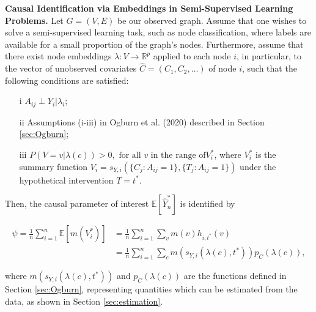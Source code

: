\documentclass{article}
\begin{document}
\begin{theorem} \textbf{Causal Identification via Embeddings in Semi-Supervised Learning Problems.}
\label{thm:identification}
Let $G = (V, E)$ be our observed graph. Assume that one wishes to solve a semi-supervised learning task, such as node classification, where labels are available for a small proportion of the graph's nodes. Furthermore, assume that there exist node embeddings $\lambda: V \to \mathbb{R}^p$ applied to each node $i$, in particular, to the vector of unobserved covariates $\hat{C} = (C_1, C_2, \hdots)$ of node $i$, such that the following conditions are satisfied:


\begin{itemize}
\item[i]  $A_{ij} \perp Y_i | \lambda_i$;
\item[ii]  Assumptions (i-iii) in Ogburn et al. (2020) \cite{Ogburn2020} described in Section \ref{sec:Ogburn};
\item[iii] $P(V = v| \lambda(c)) > 0, \mbox{ for all } v \mbox{ in the range of} V_i^*$, where $V_i^*$ is the summary function $V_i = s_{Y, i}(\{ C_j: A_{ij} =1\}, \{T_j: A_{ij} =1\})$ under the hypothetical intervention $ T = t^*$. 
\end{itemize}


Then, the causal parameter of interest  $\mathbb{E}[\hat{Y}_n^*]$ is identified by

\begin{align}
\label{eqn:identification}
\psi = \frac{1}{n} \sum_{i=1}^n \mathbb{E}[m(V_i^*)] &= \frac{1}{n} \sum_{i=1}^n \sum_v m(v) h_{i, t^*} (v) \\
&= \frac{1}{n} \sum_{i=1}^n \sum_{c} m(s_{Y, i} (\lambda(c), t^*)) p_C(\lambda(c)),
\end{align}


\noindent where $m(s_{Y, i} (\lambda(c), t^*))$ and $p_C(\lambda(c))$ are the functions defined in Section \ref{sec:Ogburn}, representing quantities which can be estimated from the data, as shown in Section \ref{sec:estimation}.
\end{theorem}
\end{document}
